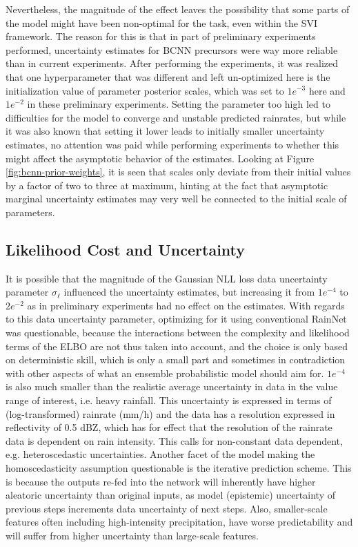 Nevertheless, the magnitude of the effect leaves the possibility that some parts of the model might have been non-optimal for the task, even within the SVI framework. The reason for this is that in part of preliminary experiments performed, uncertainty estimates for BCNN precursors were way more reliable than in current experiments. After performing the experiments, it was realized that one hyperparameter that was different and left un-optimized here is the initialization value of parameter posterior scales, which was set to $1e^{-3}$ here and $1e^{-2}$ in these preliminary experiments. Setting the parameter too high led to difficulties for the model to converge and unstable predicted rainrates, but while it was also known that setting it lower leads to initially smaller uncertainty estimates, no attention was paid while performing experiments to whether this might affect the asymptotic behavior of the estimates. Looking at Figure \ref{fig:bcnn-prior-weights}, it is seen that scales only deviate from their initial values by a factor of two to three at maximum, hinting at the fact that asymptotic marginal uncertainty estimates may very well be connected to the initial scale of parameters. 

\subsection{Likelihood Cost and Uncertainty}

It is possible that the magnitude of the Gaussian NLL loss data uncertainty parameter $\sigma_\ell$ influenced the uncertainty estimates, but increasing it from $1e^{-4}$ to $2e^{-2}$ as in preliminary experiments had no effect on the estimates. 
With regards to this data uncertainty parameter, optimizing for it using conventional RainNet was questionable, because the interactions between the complexity and likelihood terms of the ELBO are not thus taken into account, and the choice is only based on deterministic skill, which is only a small part and sometimes in contradiction with other aspects of what an ensemble probabilistic model should aim for. $1e^{-4}$ is also much smaller than the realistic average uncertainty in data in the value range of interest, i.e. heavy rainfall. This uncertainty is expressed in terms of (log-transformed) rainrate (mm/h) and the data has a resolution expressed in reflectivity of 0.5 dBZ, which has for effect that the resolution of the rainrate data is dependent on rain intensity. This calls for non-constant data dependent, e.g. heteroscedastic uncertainties. Another facet of the model making the homoscedasticity assumption questionable is the iterative prediction scheme. This is because the outputs re-fed into the network will inherently have higher aleatoric uncertainty than original inputs, as model (epistemic) uncertainty of previous steps increments data uncertainty of next steps. Also, smaller-scale features often including high-intensity precipitation, have worse predictability and will suffer from higher uncertainty than large-scale features.

